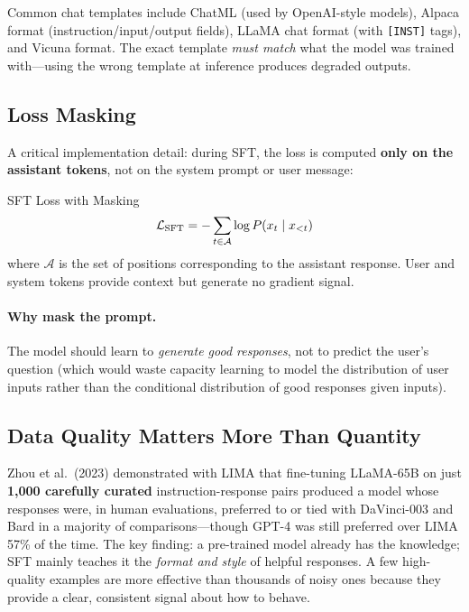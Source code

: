 Common chat templates include ChatML (used by OpenAI-style models), Alpaca
format (instruction/input/output fields), LLaMA chat format (with
\texttt{[INST]} tags), and Vicuna format.  The exact template
\emph{must match} what the model was trained with---using the wrong template
at inference produces degraded outputs.

\subsection{Loss Masking}

A critical implementation detail: during SFT, the loss is computed
\textbf{only on the assistant tokens}, not on the system prompt or user
message:

\begin{mathresult}{SFT Loss with Masking}
\[
    \mathcal{L}_{\text{SFT}} = -\sum_{t \in \mathcal{A}} \log P(x_t \mid x_{<t})
\]
where $\mathcal{A}$ is the set of positions corresponding to the assistant
response.  User and system tokens provide context but generate no gradient signal.
\end{mathresult}

\paragraph{Why mask the prompt.}
The model should learn to \emph{generate good responses}, not to predict the
user's question (which would waste capacity learning to model the distribution
of user inputs rather than the conditional distribution of good responses given
inputs).

\subsection{Data Quality Matters More Than Quantity}

\begin{keyinsight}
Zhou et al.\ (2023) demonstrated with LIMA that fine-tuning LLaMA-65B on just
\textbf{1,000 carefully curated} instruction-response pairs produced a model
whose responses were, in human evaluations, preferred to or tied with
DaVinci-003 and Bard in a majority of comparisons---though GPT-4 was still
preferred over LIMA 57\% of the time.  The
key finding: a pre-trained model already has the knowledge; SFT mainly teaches
it the \emph{format and style} of helpful responses.  A few high-quality
examples are more effective than thousands of noisy ones because they provide a
clear, consistent signal about how to behave.
\end{keyinsight}

